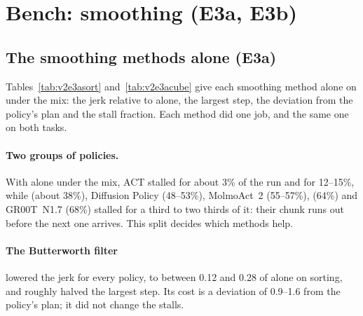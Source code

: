 \begin{table}[htbp]
  \centering
  \small
  \caption{E2 on sorting: each ablation against \drtc{} (policies whose median stall fraction rose, and the median
           change in percentage points; bold: removing the part raised the stall by a point or more, so the part
           helps).}\label{tab:v2e2sort}
\end{table}

\begin{table}[htbp]
  \centering
  \small
  \caption{E2 on cube in box v1, as Table~\ref{tab:v2e2sort}.}\label{tab:v2e2cube}
\end{table}

\section{Bench: smoothing (E3a, E3b)}\label{sec:res-e3}

\subsection{The smoothing methods alone (E3a)}

Tables~\ref{tab:v2e3asort} and~\ref{tab:v2e3acube} give each smoothing method alone on \drtc{} under the mix: the jerk
relative to \drtc{} alone, the largest step, the deviation from the policy's plan and the stall fraction. Each method
did one job, and the same one on both tasks.

\paragraph{Two groups of policies.} With \drtc{} alone under the mix, ACT stalled for about 3\% of the run and
\smolvla{} for 12--15\%, while \pizerofive{} (about 38\%), Diffusion Policy (48--53\%), MolmoAct~2 (55--57\%),
\groot{} (64\%) and GR00T~N1.7 (68\%) stalled for a third to two thirds of it: their chunk runs out before the next
one arrives. This split decides which methods help.

\paragraph{The Butterworth filter} lowered the jerk for every policy, to between 0.12 and 0.28 of \drtc{} alone on
sorting, and roughly halved the largest step. Its cost is a deviation of 0.9--1.6\degree{} from the policy's plan; it
did not change the stalls.

